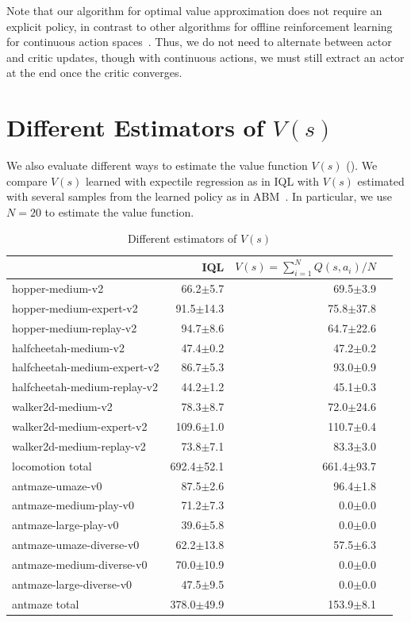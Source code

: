 \documentclass{article} %
\begin{document}
Note that our algorithm for optimal value approximation does not require an explicit policy, in contrast to other algorithms for offline reinforcement learning for continuous action spaces~\citep{fujimoto2019off, fujimoto2021minimalist, wu2019behavior, kostrikov2021offline, kumar2019stabilizing, kumar2020conservative}. Thus, we do not need to alternate between actor and critic updates, though with continuous actions, we must still extract an actor at the end once the critic converges.

\section{Different Estimators of $V(s)$}

{
We also evaluate different ways to estimate the value function $V(s)$ (). We compare $V(s)$ learned with expectile regression as in IQL with $V(s)$ estimated with several samples from the learned policy as in ABM~\citep{siegel2020keep}. In particular, we use $N=20$ to estimate the value function.}


\begin{table}[!htp]\centering
\caption{Different estimators of $V(s)$}\label{tab:abm}
\scriptsize
\begin{tabular}{l|rrr}
&IQL & $V(s)=\sum_{i=1}^N Q(s,a_i) / N$ \\\hline
hopper-medium-v2 &66.2$\pm$5.7 &69.5$\pm$3.9 \\
hopper-medium-expert-v2 &91.5$\pm$14.3 &75.8$\pm$37.8 \\
hopper-medium-replay-v2 &94.7$\pm$8.6 &64.7$\pm$22.6 \\
halfcheetah-medium-v2 &47.4$\pm$0.2 &47.2$\pm$0.2 \\
halfcheetah-medium-expert-v2 &86.7$\pm$5.3 &93.0$\pm$0.9 \\
halfcheetah-medium-replay-v2 &44.2$\pm$1.2 &45.1$\pm$0.3 \\
walker2d-medium-v2 &78.3$\pm$8.7 &72.0$\pm$24.6 \\
walker2d-medium-expert-v2 &109.6$\pm$1.0 &110.7$\pm$0.4 \\
walker2d-medium-replay-v2 &73.8$\pm$7.1 &83.3$\pm$3.0 \\ \hline
locomotion total &692.4$\pm$52.1 &661.4$\pm$93.7 \\ \hline
antmaze-umaze-v0 &87.5$\pm$2.6 &96.4$\pm$1.8 \\
antmaze-medium-play-v0 &71.2$\pm$7.3 &0.0$\pm$0.0 \\
antmaze-large-play-v0 &39.6$\pm$5.8 &0.0$\pm$0.0 \\
antmaze-umaze-diverse-v0 &62.2$\pm$13.8 &57.5$\pm$6.3 \\
antmaze-medium-diverse-v0 &70.0$\pm$10.9 &0.0$\pm$0.0 \\
antmaze-large-diverse-v0 &47.5$\pm$9.5 &0.0$\pm$0.0 \\ \hline
antmaze total &378.0$\pm$49.9 &153.9$\pm$8.1 \\
\end{tabular}
\end{table}
\end{document}

